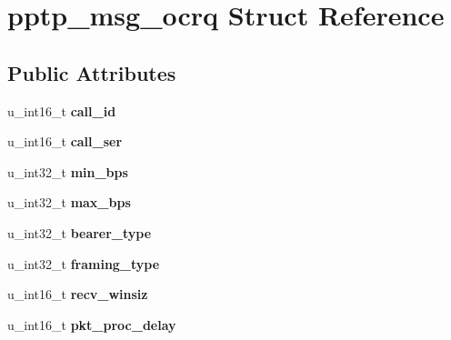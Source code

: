 \hypertarget{structpptp__msg__ocrq}{
\section{pptp\_\-msg\_\-ocrq Struct Reference}
\label{structpptp__msg__ocrq}
}
\subsection*{Public Attributes}
\begin{DoxyCompactItemize}
\item 
\hypertarget{structpptp__msg__ocrq_a3a5c9a946325dbf2331c4d480a5d3c3c}{
u\_\-int16\_\-t {\bfseries call\_\-id}}
\label{structpptp__msg__ocrq_a3a5c9a946325dbf2331c4d480a5d3c3c}

\item 
\hypertarget{structpptp__msg__ocrq_a22fafc66f2e9475881697ec51aa241e1}{
u\_\-int16\_\-t {\bfseries call\_\-ser}}
\label{structpptp__msg__ocrq_a22fafc66f2e9475881697ec51aa241e1}

\item 
\hypertarget{structpptp__msg__ocrq_aeb2cf677f637a44259c8fd7a3f3c00e1}{
u\_\-int32\_\-t {\bfseries min\_\-bps}}
\label{structpptp__msg__ocrq_aeb2cf677f637a44259c8fd7a3f3c00e1}

\item 
\hypertarget{structpptp__msg__ocrq_a663008c670c3671b6ae83f6496fb60fe}{
u\_\-int32\_\-t {\bfseries max\_\-bps}}
\label{structpptp__msg__ocrq_a663008c670c3671b6ae83f6496fb60fe}

\item 
\hypertarget{structpptp__msg__ocrq_a9923bdae650a253d61cb004c09716913}{
u\_\-int32\_\-t {\bfseries bearer\_\-type}}
\label{structpptp__msg__ocrq_a9923bdae650a253d61cb004c09716913}

\item 
\hypertarget{structpptp__msg__ocrq_a50859b5bfe76e72874dc6696c7ba2264}{
u\_\-int32\_\-t {\bfseries framing\_\-type}}
\label{structpptp__msg__ocrq_a50859b5bfe76e72874dc6696c7ba2264}

\item 
\hypertarget{structpptp__msg__ocrq_ab794f07234940f61a761eabbd2e90a8d}{
u\_\-int16\_\-t {\bfseries recv\_\-winsiz}}
\label{structpptp__msg__ocrq_ab794f07234940f61a761eabbd2e90a8d}

\item 
\hypertarget{structpptp__msg__ocrq_adfbb2a130f46fc2a2dddbe8ab64d6aeb}{
u\_\-int16\_\-t {\bfseries pkt\_\-proc\_\-delay}}
\label{structpptp__msg__ocrq_adfbb2a130f46fc2a2dddbe8ab64d6aeb}


\end{DoxyCompactItemize}
